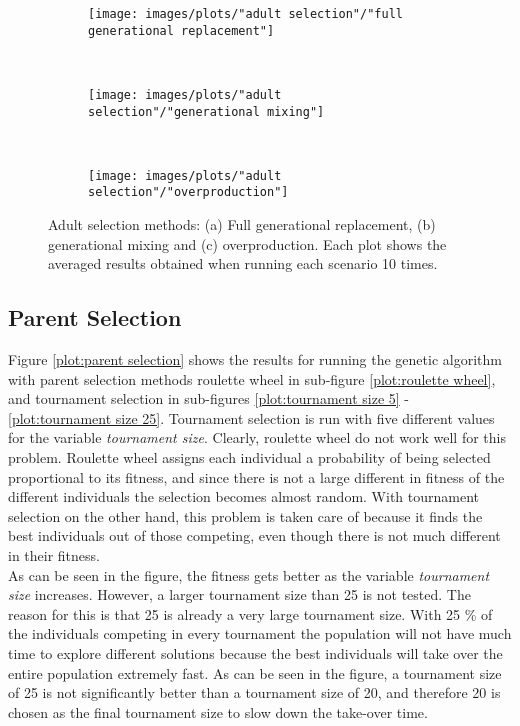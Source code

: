 \begin{figure}[h!]
    \centering
    \begin{subfigure}[b]{0.31\textwidth}
        \texttt{[image: images/plots/"adult selection"/"full generational replacement"]}
        \caption{}
        \hfill
        \label{plot:full generational replacement}
    \end{subfigure}
    ~
    \begin{subfigure}[b]{0.31\textwidth}
        \texttt{[image: images/plots/"adult selection"/"generational mixing"]}
        \caption{}
        \hfill
        \label{plot:generational mixing}
    \end{subfigure}
    ~
    \begin{subfigure}[b]{0.31\textwidth}
        \texttt{[image: images/plots/"adult selection"/"overproduction"]}
        \caption{}
        \hfill
        \label{plot:overproduction}
    \end{subfigure}
    \caption{Adult selection methods: (a) Full generational replacement, (b) generational mixing and (c) overproduction. Each plot shows the averaged results obtained when running each scenario 10 times.}
    \label{plot:adult selection methods}
\end{figure}

\subsection{Parent Selection}
Figure \ref{plot:parent selection} shows the results for running the genetic algorithm with parent selection methods roulette wheel in sub-figure \ref{plot:roulette wheel}, and tournament selection in sub-figures \ref{plot:tournament size 5} - \ref{plot:tournament size 25}. Tournament selection is run with five different values for the variable \textit{tournament size}. Clearly, roulette wheel do not work well for this problem. Roulette wheel assigns each individual a probability of being selected proportional to its fitness, and since there is not a large different in fitness of the different individuals the selection becomes almost random. With tournament selection on the other hand, this problem is taken care of because it finds the best individuals out of those competing, even though there is not much different in their fitness.\\


\noindent As can be seen in the figure, the fitness gets better as the variable \textit{tournament size} increases. However, a larger tournament size than 25 is not tested. The reason for this is that 25 is already a very large tournament size. With 25 \% of the individuals competing in every tournament the population will not have much time to explore different solutions because the best individuals will take over the entire population extremely fast. As can be seen in the figure, a tournament size of 25 is not significantly better than a tournament size of 20, and therefore 20 is chosen as the final tournament size to slow down the take-over time. \\



